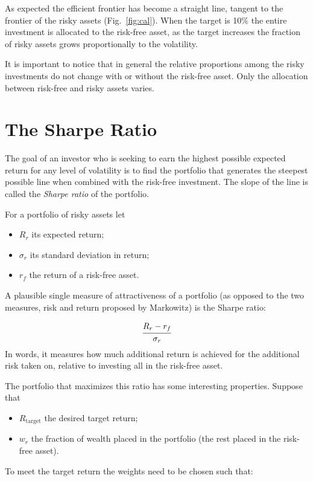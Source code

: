 As expected the efficient frontier has become a straight line, tangent to the frontier of the risky assets (Fig.~\ref{fig:cal}). When the target is 10\% the entire investment is allocated to the risk-free asset, as the target increases the fraction of risky assets grows proportionally to the volatility. 

It is important to notice that in general the relative proportions among the risky investments do not change with or without the risk-free asset. Only the allocation between risk-free and risky assets varies.

\section{The Sharpe Ratio}
\label{the-sharpe-ratio}
The goal of an investor who is seeking to earn the highest possible expected return for any level of volatility is to find the portfolio that generates the steepest possible line when combined with the risk-free investment. The slope of the line is called the \emph{Sharpe ratio} of the portfolio.

For a portfolio of risky assets let 

\begin{itemize}
\tightlist
\item \(R_r\) its expected return;
\item \(\sigma_r\) its standard deviation in return;
\item \(r_f\) the return of a risk-free asset.
\end{itemize}

A plausible single measure of attractiveness of a portfolio (as opposed to the two measures, risk and return proposed by Markowitz) is the Sharpe ratio:

\begin{equation} \cfrac{R_r - r_f}{\sigma_r} \end{equation}
\noindent
In words, it measures how much additional return is achieved for the additional risk taken on, relative to investing all in the risk-free asset. 

The portfolio that maximizes this ratio has some interesting properties. Suppose that

\begin{itemize}
\tightlist
\item
  \(R_\textrm{target}\) the desired target return;
\item
  \(w_r\) the fraction of wealth placed in the portfolio (the rest placed in the risk-free asset).
\end{itemize}
\noindent
To meet the target return the weights need to be chosen such that:

